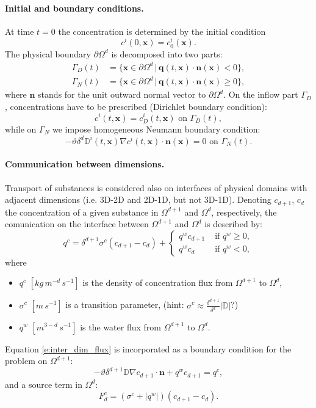 \documentclass[a4paper]{article}
\def\abs#1{\lvert#1\rvert}
\def\D{{\tn D}}
\def\vc#1{\mathbf{\boldsymbol{#1}}}     %
\def\th{\vartheta}
\def\tn#1{{\mathbb{#1}}}    %
\def\where{\,|\,}
\begin{document}
\paragraph{Initial and boundary conditions.}
At time $t=0$ the concentration is determined by the initial condition
$$ c^i(0,\vc x) = c^i_0(\vc x). $$
The physical boundary $\partial\Omega^d$ is decomposed into two parts:
\begin{align*}
\Gamma_D(t) &= \{\vc x\in \partial\Omega^d\where \vc q(t,\vc x)\cdot\vc n(\vc x)<0\},\\
\Gamma_N(t) &= \{\vc x\in \partial\Omega^d\where \vc q(t,\vc x)\cdot\vc n(\vc x)\ge 0\},
\end{align*}
where $\vc n$ stands for the unit outward normal vector to $\partial\Omega^d$.
On the inflow part $\Gamma_D$, concentrations have to be prescribed (Dirichlet boundary condition):
$$ c^i(t,\vc x) = c^i_D(t,\vc x) \mbox{ on }\Gamma_D(t), $$
while on $\Gamma_N$ we impose homogeneous Neumann boundary condition:
$$ -\th\delta^d\D^i(t,\vc x)\nabla c^i(t,\vc x)\cdot\vc n(\vc x) = 0 \mbox{ on }\Gamma_N(t). $$






\paragraph{Communication between dimensions.}
Transport of substances is considered also on interfaces of physical domains with adjacent dimensions (i.e. 3D-2D and 2D-1D, but not 3D-1D).
Denoting $c_{d+1}$, $c_d$ the concentration of a given substance in $\Omega^{d+1}$ and $\Omega^d$, respectively, the comunication on the interface between $\Omega^{d+1}$ and $\Omega^d$ is described by:
\begin{equation}
  \label{e:inter_dim_flux}
  q^c = \delta^{d+1}\sigma^c (c_{d+1} - c_d) + \begin{cases}q^w c_{d+1} & \mbox{ if }q^w\ge 0,\\q^w c_d & \mbox{ if }q^w<0,\end{cases}
\end{equation}
where
\begin{itemize}
\item $q^c$ $[kg\, m^{-d}\,s^{-1}]$ is the density of concentration flux from $\Omega^{d+1}$ to $\Omega^d$,
\item $\sigma^c$ $[m\,s^{-1}]$ is a transition parameter, (hint: $\sigma^c \approx\frac{\delta^{d+1}}{\delta^d}|\D|$?)
\item $q^w$ $[m^{3-d}\,s^{-1}]$ is the water flux from $\Omega^{d+1}$ to $\Omega^d$.
\end{itemize}
Equation \eqref{e:inter_dim_flux} is incorporated as a boundary condition for the problem on $\Omega^{d+1}$:
$$ -\th\delta^{d+1}\D\nabla c_{d+1}\cdot\vc n + q^w c_{d+1} = q^c %
, $$
and a source term in $\Omega^d$:
\begin{equation}
\label{e:FC}
F^c_d = (\sigma^c+\abs{q^w})(c_{d+1}-c_d).
\end{equation}
\end{document}
